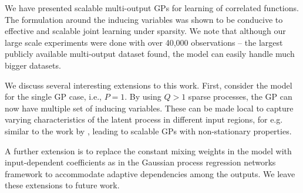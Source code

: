 We have presented scalable multi-output GPs for learning of correlated functions.
The formulation around the inducing variables was shown to be conducive to effective and scalable joint learning under sparsity. 
We note that although our large scale experiments were done with over 40,000 observations -- the largest publicly available multi-output dataset found, the model can easily handle much bigger datasets.

We discuss several interesting extensions to this work.
First, consider the model for the single GP case, i.e., $P = 1$. By using $Q > 1$ sparse processes, the GP can now have multiple set of inducing variables.
These can be made local to capture varying characteristics of the latent process in different  input regions, for e.g. similar to the 
work by \citet{nguyen2014fast}, leading to scalable GPs with non-stationary properties. 

A further extension is to replace the constant mixing weights in the model with input-dependent coefficients as in the Gaussian process regression networks framework \citep{wilson-et-al-icml-12} to accommodate adaptive dependencies among the outputs.
We leave  these extensions to future work.